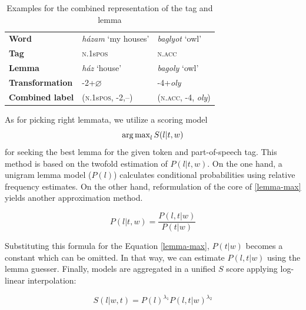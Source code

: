 \begin{table}[H]
\centering
\caption{Examples for the combined representation of the tag and lemma}
\label{tab:lemma-example}
\begin{tabular}{l | l l}
   \textbf{Word} &  \emph{házam} `my houses’ &  \emph{baglyot} `owl’ \\
   \textbf{Tag} &  \textsc{n.1}s\textsc{pos} &  \textsc{n.acc} \\
   \textbf{Lemma} &  \emph{ház} `house’ &  \emph{bagoly} `owl’ \\
   \textbf{Transformation} & -2+$\varnothing$ &  -4+\emph{oly} \\
   \textbf{Combined label} & (\textsc{n.1}s\textsc{pos}, -2,--) &  (\textsc{n.acc}, -4, \emph{oly}) \\
\end{tabular}
\end{table}


As for picking right lemmata, we utilize a scoring model
\begin{equation}\label{lemma-max}
\operatorname{arg\,max}_l S(l|t,w)
\end{equation}
for seeking the best lemma for the given token and part-of-speech tag. 
This method is based on the twofold estimation of $P(l|t,w)$. On the one hand, a unigram lemma model ($P(l)$) calculates conditional probabilities using relative frequency estimates. 
On the other hand, reformulation of the core of \eqref{lemma-max} yields another approximation method.


\begin{equation}\label{lemma-guesser}
P(l|t,w) = \frac{P(l,t|w)}{P(t|w)}
\end{equation}

Substituting this formula for the Equation \ref{lemma-max}, $P(t|w)$ becomes a constant which can be omitted. 
In that way, we can estimate $P(l,t|w)$ using the lemma guesser. Finally, models are aggregated in a unified $S$ score applying log-linear interpolation: 


\begin{equation}\label{lemma-interpolated}
S(l|w,t) = P(l)^{\lambda_1} P(l,t|w)^{\lambda_2}
\end{equation}

